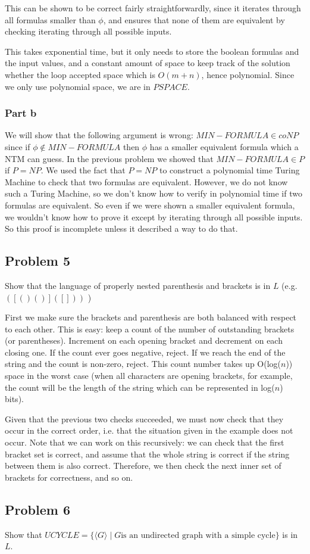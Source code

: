 \documentclass[english]{article}
\begin{document}
This can be shown to be correct fairly straightforwardly, since it iterates through all formulas smaller than
$\phi$, and ensures that none of them are equivalent by checking iterating through all possible inputs.

This takes exponential time, but it only needs to store the boolean formulas and the input values,
and a constant amount of space to keep track of the solution whether the loop accepted space which is $O(m+n)$,
hence polynomial. Since we only use polynomial space, we are in $PSPACE$.

\subsubsection{Part b}
We will show that the following argument is wrong: $MIN-FORMULA \in coNP$ since if $\phi \notin MIN-FORMULA$ then
$\phi$ has a smaller equivalent formula which a NTM can guess.
In the previous problem we showed that $MIN-FORMULA \in P$ if $P = NP$. We used the fact that $P = NP$ to construct
a polynomial time Turing Machine to check that two formulas are equivalent. However, we do not know such a Turing
Machine, so we don't know how to verify in polynomial time if two formulas are equivalent. So even if we were shown
a smaller equivalent formula, we wouldn't know how to prove it except by iterating through all possible inputs.
So this proof is incomplete unless it described a way to do that.

\subsection*{Problem 5}
Show that the language of properly nested parenthesis and brackets is in $L$ (e.g. $([()()]([]))$ )

First we make sure the brackets and parenthesis are both balanced with respect to each other.
This is easy: keep a count of the number of outstanding brackets (or parentheses). Increment on each
opening bracket and decrement on each closing one. If the count ever goes negative, reject. If we
reach the end of the string and the count is non-zero, reject. This count number takes up O(log($n$))
space in the worst case (when all characters are opening brackets, for example, the count will be
the length of the string which can be represented in log($n$) bits).

Given that the previous two checks succeeded, we must now check that they occur in the correct order,
i.e. that the situation given in the example does not occur. Note that we can work on this recursively:
we can check that the first bracket set is correct, and assume that the whole string is correct if the
string between them is also correct. Therefore, we then check the next inner set of brackets for
correctness, and so on.

\subsection*{Problem 6}
Show that $UCYCLE = \{ \langle G \rangle \mid G \textrm{is an undirected graph with a simple cycle} \}$
is in $L$.
\end{document}
